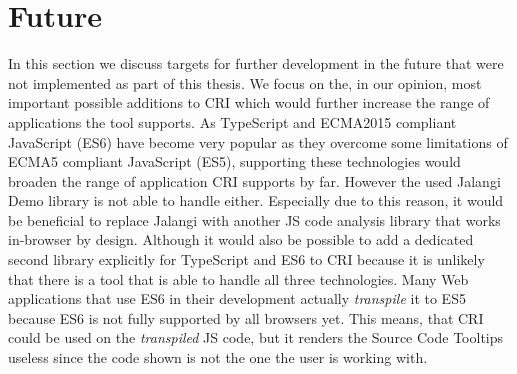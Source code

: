 \section{Future}
In this section we discuss targets for further development in the future that were not implemented as part of this thesis. We focus on the, in our opinion, most important possible additions to CRI which would further increase the range of applications the tool supports. %
As TypeScript and ECMA2015 compliant JavaScript (ES6) have become very popular as they overcome some limitations of ECMA5 compliant JavaScript (ES5), supporting these technologies would broaden the range of application CRI supports by far. However the used Jalangi Demo library is not able to handle either. Especially due to this reason, it would be beneficial to replace Jalangi with another JS code analysis library that works in-browser by design. Although it would also be possible to add a dedicated second library explicitly for TypeScript and ES6 to CRI because it is unlikely that there is a tool that is able to handle all three technologies. Many Web applications that use ES6 in their development actually \emph{transpile} it to ES5 because ES6 is not fully supported by all browsers yet. This means, that CRI could be used on the \emph{transpiled} JS code, but it renders the Source Code Tooltips useless since the code shown is not the one the user is working with.\\

